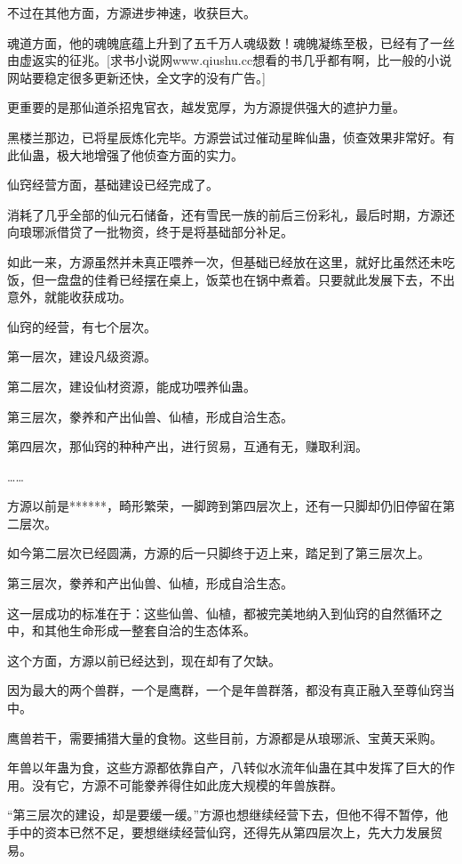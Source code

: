 \begin{this_body}
不过在其他方面，方源进步神速，收获巨大。

魂道方面，他的魂魄底蕴上升到了五千万人魂级数！魂魄凝练至极，已经有了一丝由虚返实的征兆。[求书小说网www.qiushu.cc想看的书几乎都有啊，比一般的小说网站要稳定很多更新还快，全文字的没有广告。]

更重要的是那仙道杀招鬼官衣，越发宽厚，为方源提供强大的遮护力量。

黑楼兰那边，已将星辰炼化完毕。方源尝试过催动星眸仙蛊，侦查效果非常好。有此仙蛊，极大地增强了他侦查方面的实力。

仙窍经营方面，基础建设已经完成了。

消耗了几乎全部的仙元石储备，还有雪民一族的前后三份彩礼，最后时期，方源还向琅琊派借贷了一批物资，终于是将基础部分补足。

如此一来，方源虽然并未真正喂养一次，但基础已经放在这里，就好比虽然还未吃饭，但一盘盘的佳肴已经摆在桌上，饭菜也在锅中煮着。只要就此发展下去，不出意外，就能收获成功。

仙窍的经营，有七个层次。

第一层次，建设凡级资源。

第二层次，建设仙材资源，能成功喂养仙蛊。

第三层次，豢养和产出仙兽、仙植，形成自洽生态。

第四层次，那仙窍的种种产出，进行贸易，互通有无，赚取利润。

……

方源以前是******，畸形繁荣，一脚跨到第四层次上，还有一只脚却仍旧停留在第二层次。

如今第二层次已经圆满，方源的后一只脚终于迈上来，踏足到了第三层次上。

第三层次，豢养和产出仙兽、仙植，形成自洽生态。

这一层成功的标准在于：这些仙兽、仙植，都被完美地纳入到仙窍的自然循环之中，和其他生命形成一整套自洽的生态体系。

这个方面，方源以前已经达到，现在却有了欠缺。

因为最大的两个兽群，一个是鹰群，一个是年兽群落，都没有真正融入至尊仙窍当中。

鹰兽若干，需要捕猎大量的食物。这些目前，方源都是从琅琊派、宝黄天采购。

年兽以年蛊为食，这些方源都依靠自产，八转似水流年仙蛊在其中发挥了巨大的作用。没有它，方源不可能豢养得住如此庞大规模的年兽族群。

“第三层次的建设，却是要缓一缓。”方源也想继续经营下去，但他不得不暂停，他手中的资本已然不足，要想继续经营仙窍，还得先从第四层次上，先大力发展贸易。


\end{this_body}
